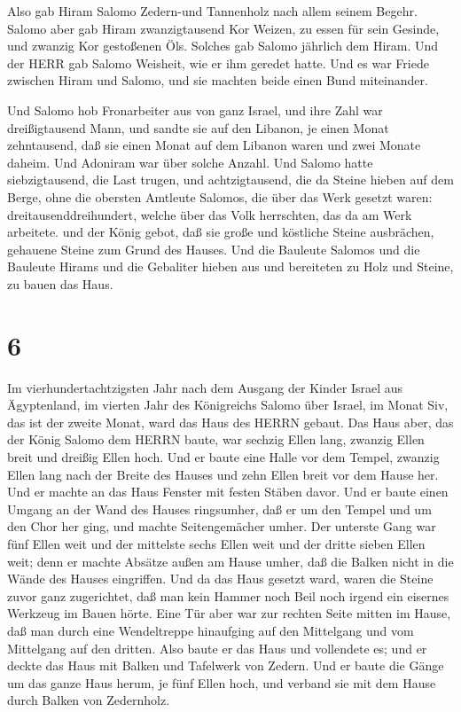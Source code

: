  Also gab Hiram Salomo Zedern-und Tannenholz nach allem
seinem Begehr.  Salomo aber gab Hiram zwanzigtausend Kor
Weizen, zu essen für sein Gesinde, und zwanzig Kor gestoßenen Öls.
Solches gab Salomo jährlich dem Hiram.  Und der HERR gab
Salomo Weisheit, wie er ihm geredet hatte. Und es war Friede zwischen
Hiram und Salomo, und sie machten beide einen Bund miteinander.

 Und Salomo hob Fronarbeiter aus von ganz Israel, und ihre
Zahl war dreißigtausend Mann,  und sandte sie auf den
Libanon, je einen Monat zehntausend, daß sie einen Monat auf dem Libanon
waren und zwei Monate daheim. Und Adoniram war über solche Anzahl.
 Und Salomo hatte siebzigtausend, die Last trugen, und
achtzigtausend, die da Steine hieben auf dem Berge,  ohne
die obersten Amtleute Salomos, die über das Werk gesetzt waren:
dreitausenddreihundert, welche über das Volk herrschten, das da am Werk
arbeitete.  und der König gebot, daß sie große und
köstliche Steine ausbrächen, gehauene Steine zum Grund des Hauses.
 Und die Bauleute Salomos und die Bauleute Hirams und die
Gebaliter hieben aus und bereiteten zu Holz und Steine, zu bauen das
Haus.

\hypertarget{section-5}{%
\section{6}\label{section-5}}

 Im vierhundertachtzigsten Jahr nach dem Ausgang der Kinder
Israel aus Ägyptenland, im vierten Jahr des Königreichs Salomo über
Israel, im Monat Siv, das ist der zweite Monat, ward das Haus des HERRN
gebaut.  Das Haus aber, das der König Salomo dem HERRN
baute, war sechzig Ellen lang, zwanzig Ellen breit und dreißig Ellen
hoch.  Und er baute eine Halle vor dem Tempel, zwanzig Ellen
lang nach der Breite des Hauses und zehn Ellen breit vor dem Hause her.
 Und er machte an das Haus Fenster mit festen Stäben davor.
 Und er baute einen Umgang an der Wand des Hauses
ringsumher, daß er um den Tempel und um den Chor her ging, und machte
Seitengemächer umher.  Der unterste Gang war fünf Ellen weit
und der mittelste sechs Ellen weit und der dritte sieben Ellen weit;
denn er machte Absätze außen am Hause umher, daß die Balken nicht in die
Wände des Hauses eingriffen.  Und da das Haus gesetzt ward,
waren die Steine zuvor ganz zugerichtet, daß man kein Hammer noch Beil
noch irgend ein eisernes Werkzeug im Bauen hörte.  Eine Tür
aber war zur rechten Seite mitten im Hause, daß man durch eine
Wendeltreppe hinaufging auf den Mittelgang und vom Mittelgang auf den
dritten.  Also baute er das Haus und vollendete es; und er
deckte das Haus mit Balken und Tafelwerk von Zedern.  Und
er baute die Gänge um das ganze Haus herum, je fünf Ellen hoch, und
verband sie mit dem Hause durch Balken von Zedernholz.

